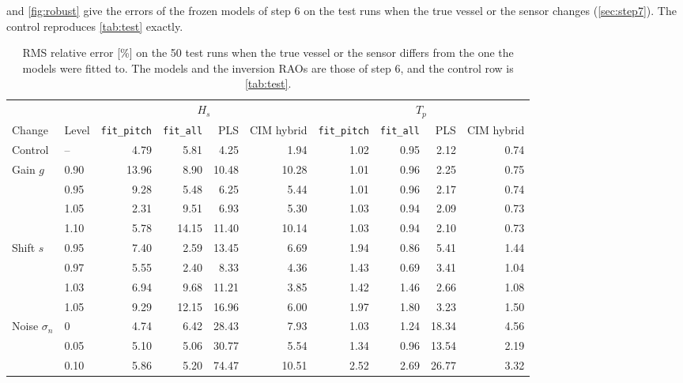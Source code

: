 \documentclass[11pt,a4paper]{article}
\newcommand{\Hs}{H_{s}}
\newcommand{\Tp}{T_{p}}
\begin{document}
 and \cref{fig:robust} give the errors of the frozen models of step 6 on the test
runs when the true vessel or the sensor changes (\cref{sec:step7}). The control reproduces
\cref{tab:test} exactly.

\begin{table}[htbp]
  \centering
  \caption{RMS relative error [\%] on the 50 test runs when the true vessel or the sensor
           differs from the one the models were fitted to. The models and the inversion RAOs
           are those of step 6, and the control row is \cref{tab:test}.}
  \label{tab:robust}
  \small
  \setlength{\tabcolsep}{3.5pt}
  \begin{tabular}{@{}llrrrrrrrr@{}}
    \toprule
    & & \multicolumn{4}{c}{$\Hs$} & \multicolumn{4}{c}{$\Tp$} \\
    \cmidrule(lr){3-6}\cmidrule(l){7-10}
    Change & Level & \texttt{fit\_pitch} & \texttt{fit\_all} & PLS & CIM hybrid
                   & \texttt{fit\_pitch} & \texttt{fit\_all} & PLS & CIM hybrid \\
    \midrule
    Control          & --   &  4.79 &  5.81 &  4.25 &  1.94 & 1.02 & 0.95 &  2.12 & 0.74 \\
    \midrule
    Gain $g$         & 0.90 & 13.96 &  8.90 & 10.48 & 10.28 & 1.01 & 0.96 &  2.25 & 0.75 \\
                     & 0.95 &  9.28 &  5.48 &  6.25 &  5.44 & 1.01 & 0.96 &  2.17 & 0.74 \\
                     & 1.05 &  2.31 &  9.51 &  6.93 &  5.30 & 1.03 & 0.94 &  2.09 & 0.73 \\
                     & 1.10 &  5.78 & 14.15 & 11.40 & 10.14 & 1.03 & 0.94 &  2.10 & 0.73 \\
    \midrule
    Shift $s$        & 0.95 &  7.40 &  2.59 & 13.45 &  6.69 & 1.94 & 0.86 &  5.41 & 1.44 \\
                     & 0.97 &  5.55 &  2.40 &  8.33 &  4.36 & 1.43 & 0.69 &  3.41 & 1.04 \\
                     & 1.03 &  6.94 &  9.68 & 11.21 &  3.85 & 1.42 & 1.46 &  2.66 & 1.08 \\
                     & 1.05 &  9.29 & 12.15 & 16.96 &  6.00 & 1.97 & 1.80 &  3.23 & 1.50 \\
    \midrule
    Noise $\sigma_n$ & 0    &  4.74 &  6.42 & 28.43 &  7.93 & 1.03 & 1.24 & 18.34 & 4.56 \\
                     & 0.05 &  5.10 &  5.06 & 30.77 &  5.54 & 1.34 & 0.96 & 13.54 & 2.19 \\
                     & 0.10 &  5.86 &  5.20 & 74.47 & 10.51 & 2.52 & 2.69 & 26.77 & 3.32 \\
    \bottomrule
  \end{tabular}
\end{table}
\end{document}

